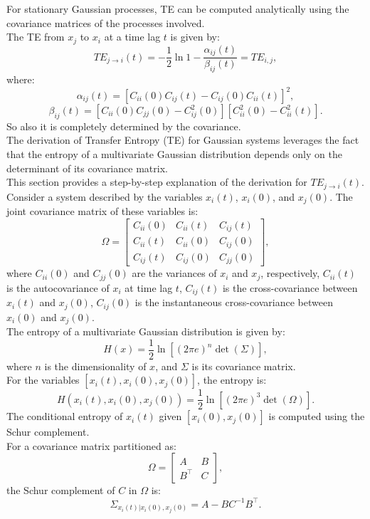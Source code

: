 \documentclass[English, Lau, oneside]{sapthesis}
\begin{document}
For stationary Gaussian processes, TE can be computed analytically using the covariance matrices of the processes involved. \\
The TE from \(x_j\) to \(x_i\) at a time lag \(t\) is given by:\cite{ref13}
\begin{equation}
TE_{j \to i}(t) = -\frac{1}{2} \ln{1 - \frac{\alpha_{ij}(t)}{\beta_{ij}(t)}}=TE_{i,j},\label{TE}
\end{equation}
where:
\begin{equation}
\alpha_{ij}(t) = \left[C_{ii}(0)C_{ij}(t) - C_{ij}(0)C_{ii}(t)\right]^2,\label{alpha}
\end{equation}
\begin{equation}
\beta_{ij}(t) = \left[C_{ii}(0)C_{jj}(0) - C_{ij}^2(0)\right]\left[C_{ii}^2(0) - C_{ii}^2(t)\right].\label{beta}
\end{equation}
So also it is completely determined by the covariance.\\
The derivation of Transfer Entropy (TE) for Gaussian systems leverages the fact that the entropy of a multivariate Gaussian distribution depends only on the determinant of its covariance matrix.\\
This section provides a step-by-step explanation of the derivation for \( TE_{j \to i}(t) \).\cite{ref13}
Consider a system described by the variables \(x_i(t)\), \(x_i(0)\), and \(x_j(0)\). The joint covariance matrix of these variables is:
\[
\Omega = \begin{bmatrix}
C_{ii}(0) & C_{ii}(t) & C_{ij}(t) \\
C_{ii}(t) & C_{ii}(0) & C_{ij}(0) \\
C_{ij}(t) & C_{ij}(0) & C_{jj}(0)
\end{bmatrix},
\]
where \(C_{ii}(0)\) and \(C_{jj}(0)\) are the variances of \(x_i\) and \(x_j\), respectively, \(C_{ii}(t)\) is the autocovariance of \(x_i\) at time lag \(t\), \(C_{ij}(t)\) is the cross-covariance between \(x_i(t)\) and \(x_j(0)\), \(C_{ij}(0)\) is the instantaneous cross-covariance between \(x_i(0)\) and \(x_j(0)\).\\
The entropy of a multivariate Gaussian distribution is given by:
\[
H({x}) = \frac{1}{2} \ln{[(2\pi e)^n \det(\Sigma)]},
\]
where \(n\) is the dimensionality of \({x}\), and \(\Sigma\) is its covariance matrix.\\
For the variables \([x_i(t), x_i(0), x_j(0)]\), the entropy is:
\[
H(x_i(t), x_i(0), x_j(0)) = \frac{1}{2} \ln{[(2\pi e)^3 \det(\Omega)]}.
\]
The conditional entropy of \(x_i(t)\) given \([x_i(0), x_j(0)]\) is computed using the Schur complement.\\
For a covariance matrix partitioned as:
\[
\Omega = \begin{bmatrix}
A & B \\
B^\top & C
\end{bmatrix},
\]
the Schur complement of \(C\) in \(\Omega\) is:
\[
\Sigma_{x_i(t) | x_i(0), x_j(0)} = A - B C^{-1} B^\top.
\]
\end{document}
